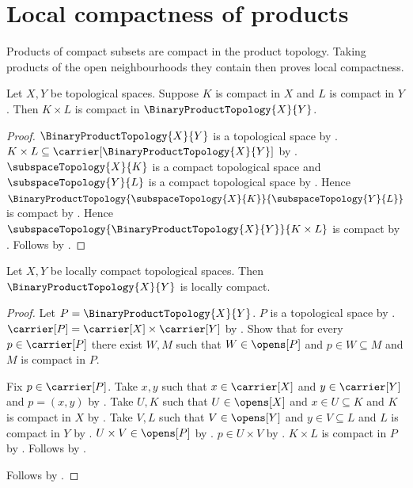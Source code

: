 \section{Local compactness of products}





Products of compact subsets are compact in the product topology. Taking
products of the open neighbourhoods they contain then proves local compactness.

\begin{theorem}\label{product_of_compact_subsets}
    Let $X,Y$ be topological spaces.
    Suppose $K$ is compact in $X$ and $L$ is compact in $Y$.
    Then $K\times L$ is compact in $\BinaryProductTopology{X}{Y}$.
\end{theorem}
\begin{proof}
    $\BinaryProductTopology{X}{Y}$ is a topological space by
        .
    $K\times L\subseteq\carrier[\BinaryProductTopology{X}{Y}]$ by
        .
    $\subspaceTopology{X}{K}$ is a compact topological space and
        $\subspaceTopology{Y}{L}$ is a compact topological space by
        .
    Hence $\BinaryProductTopology{\subspaceTopology{X}{K}}{\subspaceTopology{Y}{L}}$
        is compact by .
    Hence $\subspaceTopology{\BinaryProductTopology{X}{Y}}{K\times L}$ is compact by
        .
    Follows by .
\end{proof}

\begin{theorem}\label{binary_product_of_locally_compact_spaces}
    Let $X,Y$ be locally compact topological spaces.
    Then $\BinaryProductTopology{X}{Y}$ is locally compact.
\end{theorem}
\begin{proof}
    Let $P=\BinaryProductTopology{X}{Y}$.
    $P$ is a topological space by .
    $\carrier[P]=\carrier[X]\times\carrier[Y]$ by .
    Show that for every $p\in\carrier[P]$ there exist $W,M$ such that
        $W\in\opens[P]$ and $p\in W\subseteq M$ and $M$ is compact in $P$.
    \begin{subproof}
        Fix $p\in\carrier[P]$.
        Take $x,y$ such that $x\in\carrier[X]$ and $y\in\carrier[Y]$ and $p=(x,y)$ by
            .
        Take $U,K$ such that $U\in\opens[X]$ and $x\in U\subseteq K$ and
            $K$ is compact in $X$ by .
        Take $V,L$ such that $V\in\opens[Y]$ and $y\in V\subseteq L$ and
            $L$ is compact in $Y$ by .
        $U\times V\in\opens[P]$ by .
        $p\in U\times V$ by .
        $K\times L$ is compact in $P$ by .
        Follows by .
    \end{subproof}
    Follows by .
\end{proof}
